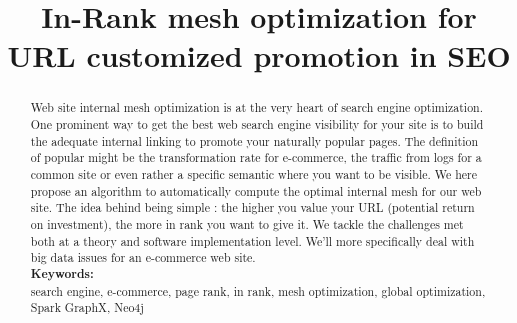 \documentclass{iSWAGArticle}
\title{In-Rank mesh optimization for URL customized promotion in SEO}
\author{\iSWAGAuthor{Stefan Duprey\\
Cdiscount\\
stefan.duprey@cdiscount.com} \and \iSWAGAuthor{Fabien Jaunas\\
Cdiscount\\
fabien.jaunas@cdiscount.com}}
\begin{document}
\maketitle
\begin{abstract}
 Web site internal mesh optimization is at the very heart of search engine optimization. 
 One prominent way to get the best web search engine visibility for your site 
 is to build the adequate internal linking to promote your naturally popular pages. 
 The definition of popular might be the transformation rate for e-commerce, 
 the traffic from logs for a common site or even rather a specific semantic where you want to be visible. 
 We here propose an algorithm to automatically compute the optimal internal mesh for our web site. The idea
 behind being simple : the higher you value your URL (potential return on investment), the more in rank you want to give it.
 We tackle the challenges met both at a theory and software implementation level. 
 We'll more specifically deal with big data issues for an e-commerce web site.
 \\\newline
 \indent \textbf{Keywords: }
 \\\newline
search engine, e-commerce, page rank, in rank, mesh optimization, global optimization, Spark GraphX, Neo4j
\end{abstract}
\end{document}
